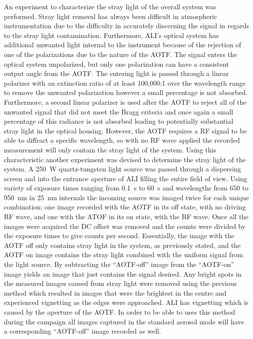 \documentclass[12pt]{article}
\begin{document}
An experiment to characterize the stray light of the overall system was performed. Stray light removal has always been difficult in atmospheric instrumentation due to the difficulty in accurately discerning the signal in regards to the stray light contamination. Furthermore, ALI's optical system has additional unwanted light internal to the instrument because of the rejection of one of the polarizations due to the nature of the AOTF. The signal enters the optical system unpolarized, but only one polarization can have a consistent output angle from the AOTF. The entering light is passed through a linear polarizer with an extinction ratio of at least 100,000:1 over the wavelength range to remove the unwanted polarization however a small percentage is not absorbed. Furthermore, a second linear polarizer is used after the AOTF to reject all of the unwanted signal that did not meet the Bragg criteria and once again a small percentage of this radiance is not absorbed leading to potentially substantial stray light in the optical housing. However, the AOTF requires a RF signal to be able to diffract a specific wavelength, so with no RF wave applied the recorded measurement will only contain the stray light of the system. Using this characteristic another experiment was devised to determine the stray light of the system. A 250~W quartz-tungsten light source was passed through a dispersing screen and into the entrance aperture of ALI filling the entire field of view. Using variety of exposure times ranging from 0.1~s to 60~s and wavelengths from 650 to 950~nm in 25~nm internals the incoming source was imaged twice for each unique combination; one image recorded with the AOTF in its off state, with no driving RF wave, and one with the ATOF in its on state, with the RF wave. Once all the images were acquired the DC offset was removed and the counts were divided by the exposure times to give counts per second. Essentially, the image with the AOTF off only contains stray light in the system, as previously stated, and the AOTF on image contains the stray light combined with the uniform signal from the light source. By subtracting the ``AOTF-off'' image from the ``AOTF-on'' image yields an image that just contains the signal desired. Any bright spots in the measured images caused from stray light were removed using the previous method which resulted in images that were the brightest in the centre and experienced vignetting as the edges were approached. ALI has vignetting which is caused by the aperture of the AOTF. In order to be able to uses this method during the campaign all images captured in the standard aerosol mode will have a corresponding ``AOTF-off'' image recorded as well.
\end{document}
